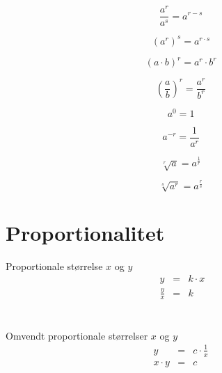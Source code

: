 \documentclass[11pt,a5paper,fleqn,leqno]{book}
\begin{document}
\begin{equation} \label{eq:potens_dividere}
\dfrac{a^r}{a^s} = a^{r-s}
\end{equation}

\begin{equation} \label{eq:potens_potens}
\left(a^r\right)^s = a^{r \cdot s}
\end{equation}

\begin{equation} \label{eq:potens_faktorer}
\left(a \cdot b\right)^{r} = a^{r} \cdot b^{r}
\end{equation}

\begin{equation} \label{eq:potens_divisor}
\left(\dfrac{a}{b}\right)^{r} = \dfrac{a^{r}}{b^{r}}
\end{equation}

\begin{equation} \label{eq:potens_nulte}
a^{0} = 1
\end{equation}

\begin{equation} \label{eq:potens_minuste}
a^{-r} = \dfrac{1}{a^{r}}
\end{equation}

\begin{equation} \label{eq:potens_kvadratrod}
\sqrt[r]{a} = a^{\frac{1}{r}}
\end{equation}

\begin{equation} \label{eq:potens_kvadratrod_potens}
\sqrt[s]{a^{r}} = a^{\frac{r}{s}}
\end{equation}

\vfill

\section{Proportionalitet}

Proportionale størrelse $x$ og $y$
\begin{eqnarray}
\; y & =&  k \cdot x \\
\; \frac{y}{x} & = & k \nonumber
\end{eqnarray}
\\
\\
Omvendt proportionale størrelser $x$ og $y$
\begin{eqnarray}
y & = & c \cdot \frac{1}{x} \\
x \cdot y & = & c \nonumber
\end{eqnarray}
\end{document}
